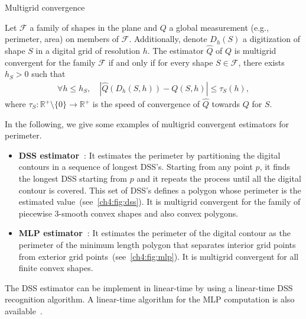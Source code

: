 \begin{definition}{Multigrid convergence}

Let $\mathcal{F}$ a family of shapes in the plane and $Q$ a global measurement (e.g., perimeter, area) on members of $\mathcal{F}$. Additionally, denote $D_h(S)$ a digitization of shape $S$ in a digital grid of resolution $h$. The estimator $\hat{Q}$ of $Q$ is multigrid convergent for the family $\mathcal{F}$ if and only if for every shape $S \in \mathcal{F}$, there exists $h_S > 0$ such that
\begin{align*}
\forall h \leq h_S, \quad |\hat{Q}(D_h(S,h)) - Q(S,h)| \leq \tau_S(h),
\end{align*}
%
where $\tau_S:\mathbb{R}^+\setminus \{0\} \rightarrow \mathbb{R}^+$ is the speed of convergence of $\hat{Q}$ towards $Q$ for $S$.

\end{definition}

In the following, we give some examples of multigrid convergent estimators for perimeter.

\begin{itemize}
	\item[]{\textbf{DSS estimator~\cite{kovalevsky92theoretical}}: It estimates the perimeter by partitioning the digital contours in a sequence of longest DSS's. Starting from any point $p$, it finds the longest DSS starting from $p$ and it repeats the process until all the digital contour is covered. This set of DSS's defines a polygon whose perimeter is the estimated value~(see~\cref{ch4:fig:dss}). It is multigrid convergent for the family of piecewise $3$-smooth convex shapes and also convex polygons.}
	\item[]{\textbf{MLP estimator~\cite{sloboda98approximation}}: It estimates the perimeter of the digital contour as the perimeter of the minimum length polygon that separates interior grid points from exterior grid points~(see~\cref{ch4:fig:mlp}). It is multigrid convergent for all finite convex shapes.}
\end{itemize}

The DSS estimator can be implement in linear-time by using a linear-time DSS recognition algorithm. A linear-time algorithm for the MLP computation is also available~\cite{provenccal09two}.

